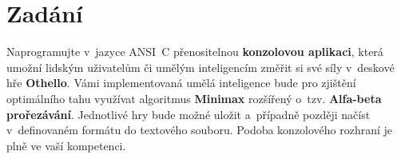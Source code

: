 \section{Zadání}

Naprogramujte v~jazyce ANSI~C přenositelnou \textbf{konzolovou aplikaci}, která umožní lidským uživatelům či umělým inteligencím změřit si své síly v~deskové hře \textbf{Othello}. Vámi implementovaná umělá inteligence bude pro zjištění optimálního tahu využívat algoritmus \textbf{Minimax} rozšířený o~tzv. \textbf{Alfa-beta prořezávání}. Jednotlivé hry bude možné uložit a~případně později načíst v~definovaném formátu do textového souboru. Podoba konzolového rozhraní je plně ve vaší kompetenci.